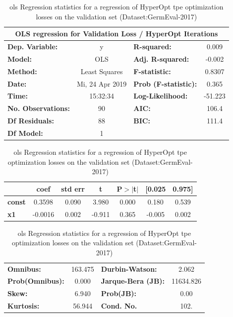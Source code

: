 \begin{table}[H]
	\begin{center}
		\begin{tabular}{lclc}
		\toprule
		\multicolumn{4}{c}{OLS regression for Validation Loss / HyperOpt Iterations} \\
		\midrule
		\textbf{Dep. Variable:}    &        y        & \textbf{  R-squared:        } &     0.009   \\
		\textbf{Model:}            &       OLS       & \textbf{  Adj. R-squared:   } &    -0.002   \\
		\textbf{Method:}           &  Least Squares  & \textbf{  F-statistic:      } &    0.8307   \\
		\textbf{Date:}             & Mi, 24 Apr 2019 & \textbf{  Prob (F-statistic):} &    0.365    \\
		\textbf{Time:}             &     15:32:34    & \textbf{  Log-Likelihood:   } &   -51.223   \\
		\textbf{No. Observations:} &          90     & \textbf{  AIC:              } &     106.4   \\
		\textbf{Df Residuals:}     &          88     & \textbf{  BIC:              } &     111.4   \\
		\textbf{Df Model:}         &           1     & \textbf{                     } &             \\
		\bottomrule
		\end{tabular}
		\begin{tabular}{lcccccc}
					   & \textbf{coef} & \textbf{std err} & \textbf{t} & \textbf{P$>$$|$t$|$} & \textbf{[0.025} & \textbf{0.975]}  \\
		\midrule
		\textbf{const} &       0.3598  &        0.090     &     3.980  &         0.000        &        0.180    &        0.539     \\
		\textbf{x1}    &      -0.0016  &        0.002     &    -0.911  &         0.365        &       -0.005    &        0.002     \\
		\bottomrule
		\end{tabular}
		\begin{tabular}{lclc}
		\textbf{Omnibus:}       & 163.475 & \textbf{  Durbin-Watson:    } &     2.062  \\
		\textbf{Prob(Omnibus):} &   0.000 & \textbf{  Jarque-Bera (JB): } & 11634.826  \\
		\textbf{Skew:}          &   6.940 & \textbf{  Prob(JB):         } &      0.00  \\
		\textbf{Kurtosis:}      &  56.944 & \textbf{  Cond. No.          } &      102.  \\
		\bottomrule
		\end{tabular}
	\end{center}
	\caption{\gls{ols} Regression statistics for a regression of HyperOpt \gls{tpe} optimization losses on the validation set {(Dataset:GermEval-2017)}}
	\label{tab:08_olsLossItVal}	
\end{table}

